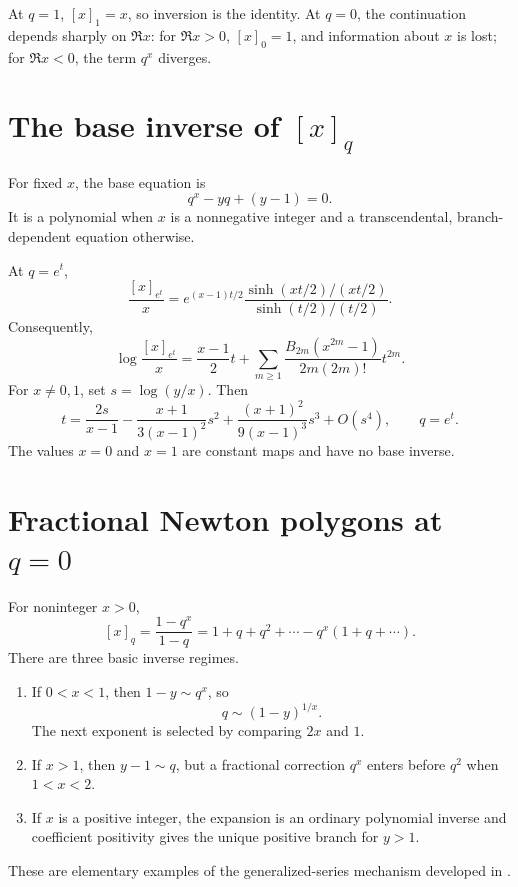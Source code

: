 \documentclass[11pt,letterpaper,oneside,openany]{book}
\theoremstyle{definition}
\theoremstyle{remark}
\begin{document}
At \(q=1\), \([x]_1=x\), so inversion is the identity.  At \(q=0\), the
continuation depends sharply on \(\Re x\): for \(\Re x>0\), \([x]_0=1\), and
information about \(x\) is lost; for \(\Re x<0\), the term \(q^x\) diverges.

\section{The base inverse of \texorpdfstring{\([x]_q\)}{[x]q}}
For fixed \(x\), the base equation is
\begin{equation}\label{eq:qnumber-base-equation}
 q^x-yq+(y-1)=0.
\end{equation}
It is a polynomial when \(x\) is a nonnegative integer and a transcendental,
branch-dependent equation otherwise.

At \(q=e^t\),
\begin{equation}\label{eq:qnumber-hyperbolic}
 \frac{[x]_{e^t}}{x}
 =e^{(x-1)t/2}
 \frac{\sinh(xt/2)/(xt/2)}{\sinh(t/2)/(t/2)}.
\end{equation}
Consequently,
\begin{equation}\label{eq:qnumber-q1-forward}
 \log\frac{[x]_{e^t}}x
 =\frac{x-1}{2}t+
 \sum_{m\ge1}\frac{B_{2m}(x^{2m}-1)}{2m(2m)!}t^{2m}.
\end{equation}
For \(x\ne0,1\), set \(s=\log(y/x)\).  Then
\begin{equation}\label{eq:qnumber-q1-inverse}
 t=\frac{2s}{x-1}-\frac{x+1}{3(x-1)^2}s^2
 +\frac{(x+1)^2}{9(x-1)^3}s^3+O(s^4),
 \qquad q=e^t.
\end{equation}
The values \(x=0\) and \(x=1\) are constant maps and have no base inverse.

\section{Fractional Newton polygons at \texorpdfstring{\(q=0\)}{q=0}}
For noninteger \(x>0\),
\[
 [x]_q=\frac{1-q^x}{1-q}=1+q+q^2+\cdots-q^x(1+q+\cdots).
\]
There are three basic inverse regimes.
\begin{enumerate}[label=(\roman*)]
\item If \(0<x<1\), then \(1-y\sim q^x\), so
\[
 q\sim(1-y)^{1/x}.
\]
The next exponent is selected by comparing \(2x\) and \(1\).
\item If \(x>1\), then \(y-1\sim q\), but a fractional correction
\(q^x\) enters before \(q^2\) when \(1<x<2\).
\item If \(x\) is a positive integer, the expansion is an ordinary polynomial
inverse and coefficient positivity gives the unique positive branch for
\(y>1\).
\end{enumerate}
These are elementary examples of the generalized-series mechanism developed in
.
\end{document}
